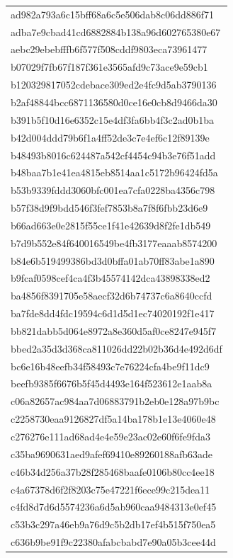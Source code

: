\begin{tabular}{l}
ad982a793a6c15bff68a6c5e506dab8c06dd886f71 \\
adba7e9cbad41cd6882884b138a96d602765380e67 \\
aebc29ebebfffb6f577f508cddf9803eca73961477 \\
b07029f7fb67f187f361e3565afd9c73ace9e59cb1 \\
b120329817052cdebace309ed2e4fc9d5ab3790136 \\
b2af48844bcc6871136580d0ce16e0cb8d9466da30 \\
b391b5f10d16e6352c15e4df3fa6bb4f3c2ad0b1ba \\
b42d004ddd79b6f1a4ff52de3c7e4ef6c12f89139e \\
b48493b8016c624487a542cf4454c94b3e76f51add \\
b48baa7b1e41ea4815eb8514aa1c5172b96424fd5a \\
b53b9339fddd3060bfc001ea7cfa0228ba4356c798 \\
b57f38d9f9bdd546f3fef7853b8a7f8f6fbb23d6e9 \\
b66ad663e0e2815f55ce1f41e42639d8f2fe1db549 \\
b7d9b552e84f640016549be4fb3177eaaab8574200 \\
b84e6b519499386bd3d0bffa01ab70ff83abe1a890 \\
b9fcaf0598cef4ca4f3b45574142dca43898338ed2 \\
ba4856f8391705e58aecf32d6b74737c6a8640ccfd \\
ba7fde8dd4fdc19594c6d1d5d1ec74020192f1e417 \\
bb821dabb5d064e8972a8e360d5af0ce8247e945f7 \\
bbed2a35d3d368ca811026dd22b02b36d4e492d6df \\
bc6e16b48eefb34f58493c7e76224cfa4be9f11dc9 \\
beefb9385f6676b5f45d4493e164f523612e1aab8a \\
c06a82657ac984aa7d06883791b2eb0e128a97b9bc \\
c2258730eaa9126827df5a14ba178b1e13e4060e48 \\
c276276e111ad68ad4e4e59e23ac02e60f6fe9fda3 \\
c35ba9690631aed9afef69410e89260188afb63ade \\
c46b34d256a37b28f285468baafe0106b80cc4ee18 \\
c4a67378d6f2f8203c75e47221f6ece99c215dea11 \\
c4fd8d7d6d5574236a6d5ab960caa9484313e0ef45 \\
c53b3c297a46eb9a76d9c5b2db17ef4b515f750ea5 \\
c636b9be91f9c22380afabcbabd7e90a05b3cee44d \\

\end{tabular}
